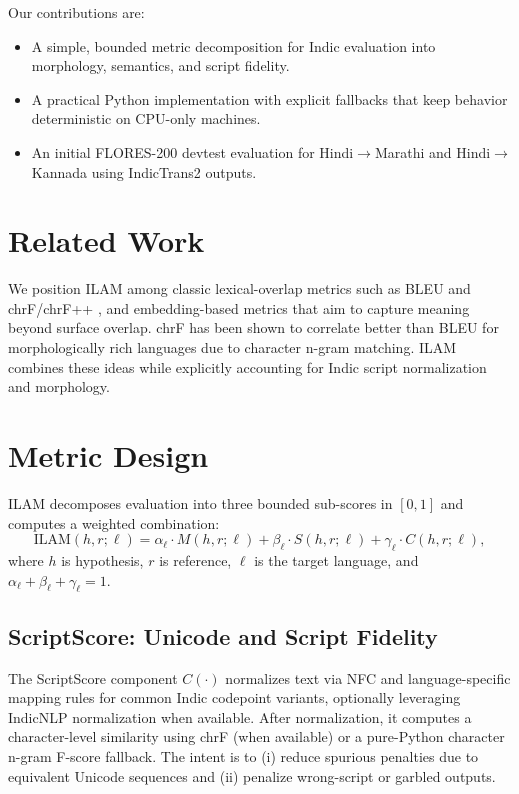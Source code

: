 \documentclass[conference]{IEEEtran}
\begin{document}
Our contributions are:
\begin{itemize}
  \item A simple, bounded metric decomposition for Indic evaluation into morphology, semantics, and script fidelity.
  \item A practical Python implementation with explicit fallbacks that keep behavior deterministic on CPU-only machines.
  \item An initial FLORES-200 devtest evaluation for Hindi$\rightarrow$Marathi and Hindi$\rightarrow$Kannada using IndicTrans2 outputs.
\end{itemize}

\section{Related Work}
We position ILAM among classic lexical-overlap metrics such as BLEU \cite{papineni2002bleu} and chrF/chrF++ \cite{popovic2015chrf}, and embedding-based metrics that aim to capture meaning beyond surface overlap. chrF has been shown to correlate better than BLEU for morphologically rich languages due to character n-gram matching. ILAM combines these ideas while explicitly accounting for Indic script normalization and morphology.

\section{Metric Design}
ILAM decomposes evaluation into three bounded sub-scores in $[0,1]$ and computes a weighted combination:
\begin{equation}
\mathrm{ILAM}(h,r;\ell) = \alpha_\ell \cdot M(h,r;\ell) + \beta_\ell \cdot S(h,r;\ell) + \gamma_\ell \cdot C(h,r;\ell),
\end{equation}
where $h$ is hypothesis, $r$ is reference, $\ell$ is the target language, and $\alpha_\ell+\beta_\ell+\gamma_\ell=1$.

\subsection{ScriptScore: Unicode and Script Fidelity}
The ScriptScore component $C(\cdot)$ normalizes text via NFC and language-specific mapping rules for common Indic codepoint variants, optionally leveraging IndicNLP normalization when available. After normalization, it computes a character-level similarity using chrF (when available) or a pure-Python character n-gram F-score fallback. The intent is to (i) reduce spurious penalties due to equivalent Unicode sequences and (ii) penalize wrong-script or garbled outputs.
\end{document}
